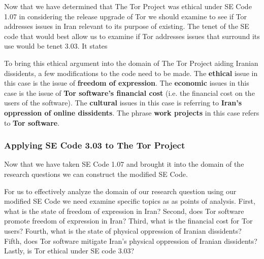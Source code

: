 \documentclass[11pt]{article}
\begin{document}
\begin{multicols}{2}
Now that we have determined that The Tor Project was ethical under SE Code 1.07
in considering the release upgrade of Tor we should examine to see if Tor
addresses issues in Iran relevant to its purpose of existing. The tenet of the
SE code that would best allow us to examine if Tor addresses issues that
surround its use would be tenet 3.03.  It states
\newline
\begin{center}
\end{center}
\smallskip
To bring this ethical argument into the domain of The Tor Project aiding Iranian
dissidents, a few modifications to the code need to be made. The
\textbf{ethical} issue in this case is the issue of \textbf{freedom of
expression}. The \textbf{economic} issues in this case is the issue of
\textbf{Tor software's financial cost} (i.e. the financial cost on the users of
the software). The \textbf{cultural} issues in this case is referring to
\textbf{Iran's oppression of online dissidents}. The phrase \textbf{work
projects} in this case refers to \textbf{Tor software}.

\subsubsection{Applying SE Code 3.03 to The Tor Project}

Now that we have taken SE Code 1.07 and brought it into the domain of the
research questions we can construct the modified SE Code.
\newline
\begin{center}
\end{center}
\smallskip
For us to effectively analyze the domain of our research question using our modified
SE Code we need examine specific topics as as points of analysis.  First, what
is the state of freedom of expression in Iran? Second, does Tor software
promote freedom of expression in Iran? Third, what is the financial cost for
Tor users?  Fourth, what is the state of physical oppression of Iranian
dissidents? Fifth, does Tor software mitigate Iran's physical oppression of
Iranian dissidents?
Lastly, is Tor ethical under SE code 3.03?


\end{multicols}
\end{document}
